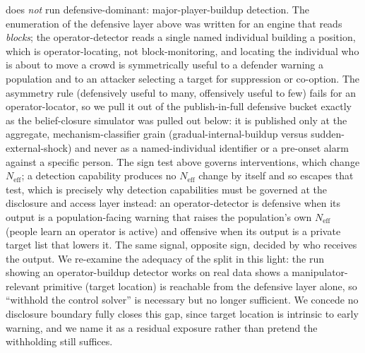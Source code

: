 \documentclass[11pt]{article}
\begin{document}
does \emph{not} run defensive-dominant: major-player-buildup detection. The enumeration of the defensive layer above was written for an engine that reads \emph{blocks}; the operator-detector reads a single named individual building a position, which is operator-locating, not block-monitoring, and locating the individual who is about to move a crowd is symmetrically useful to a defender warning a population and to an attacker selecting a target for suppression or co-option. The asymmetry rule (defensively useful to many, offensively useful to few) fails for an operator-locator, so we pull it out of the publish-in-full defensive bucket exactly as the belief-closure simulator was pulled out below: it is published only at the aggregate, mechanism-classifier grain (gradual-internal-buildup versus sudden-external-shock) and never as a named-individual identifier or a pre-onset alarm against a specific person. The sign test above governs interventions, which change $N_{\mathrm{eff}}$; a detection capability produces no $N_{\mathrm{eff}}$ change by itself and so escapes that test, which is precisely why detection capabilities must be governed at the disclosure and access layer instead: an operator-detector is defensive when its output is a population-facing warning that raises the population's own $N_{\mathrm{eff}}$ (people learn an operator is active) and offensive when its output is a private target list that lowers it. The same signal, opposite sign, decided by who receives the output. We re-examine the adequacy of the split in this light: the run showing an operator-buildup detector works on real data shows a manipulator-relevant primitive (target location) is reachable from the defensive layer alone, so ``withhold the control solver'' is necessary but no longer sufficient. We concede no disclosure boundary fully closes this gap, since target location is intrinsic to early warning, and we name it as a residual exposure rather than pretend the withholding still suffices.
\end{document}
